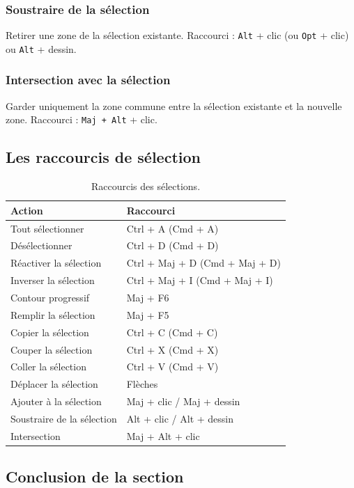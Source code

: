 \subsubsection{Soustraire de la sélection}

Retirer une zone de la sélection existante. Raccourci : \texttt{Alt} + clic (ou \texttt{Opt} + clic) ou \texttt{Alt} + dessin.

\subsubsection{Intersection avec la sélection}

Garder uniquement la zone commune entre la sélection existante et la nouvelle zone. Raccourci : \texttt{Maj + Alt} + clic.

\subsection{Les raccourcis de sélection}

\begin{table}[h!]
\centering
\begin{tabular}{@{}ll@{}}
\toprule
\textbf{Action} & \textbf{Raccourci} \\
\midrule
Tout sélectionner & Ctrl + A (Cmd + A) \\
Désélectionner & Ctrl + D (Cmd + D) \\
Réactiver la sélection & Ctrl + Maj + D (Cmd + Maj + D) \\
Inverser la sélection & Ctrl + Maj + I (Cmd + Maj + I) \\
Contour progressif & Maj + F6 \\
Remplir la sélection & Maj + F5 \\
Copier la sélection & Ctrl + C (Cmd + C) \\
Couper la sélection & Ctrl + X (Cmd + X) \\
Coller la sélection & Ctrl + V (Cmd + V) \\
Déplacer la sélection & Flèches \\
Ajouter à la sélection & Maj + clic / Maj + dessin \\
Soustraire de la sélection & Alt + clic / Alt + dessin \\
Intersection & Maj + Alt + clic \\
\bottomrule
\end{tabular}
\caption{Raccourcis des sélections.}
\end{table}

\subsection*{Conclusion de la section}


